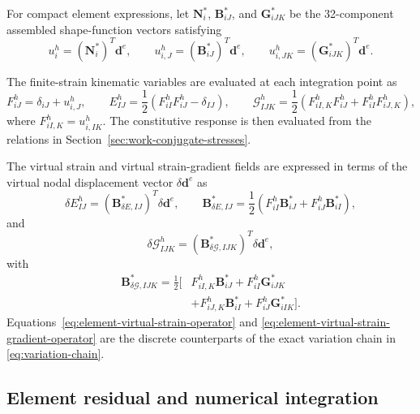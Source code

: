\documentclass[preprint,12pt]{elsarticle}
\begin{document}
For compact element expressions, let $\mathbf{N}_i^{*}$, $\mathbf{B}_{iJ}^{*}$,
and $\mathbf{G}_{iJK}^{*}$ be the 32-component assembled shape-function
vectors satisfying
\begin{equation}
 u_i^h=\left(\mathbf{N}_i^{*}\right)^T\mathbf{d}^e,
 \qquad
 u_{i,J}^h=\left(\mathbf{B}_{iJ}^{*}\right)^T\mathbf{d}^e,
 \qquad
 u_{i,JK}^h=\left(\mathbf{G}_{iJK}^{*}\right)^T\mathbf{d}^e.
 \label{eq:element-shape-function-vectors}
\end{equation}

The finite-strain kinematic variables are evaluated at each integration
point as
\begin{equation}
 F_{iJ}^h=\delta_{iJ}+u_{i,J}^h,
 \qquad
 E_{IJ}^h=\frac{1}{2}\left(F_{iI}^hF_{iJ}^h-\delta_{IJ}\right),
 \qquad
 \mathcal{G}_{IJK}^h
 =\frac{1}{2}\left(F_{iI,K}^hF_{iJ}^h
 +F_{iI}^hF_{iJ,K}^h\right),
 \label{eq:element-kinematic-variables}
\end{equation}
where $F_{iI,K}^h=u_{i,IK}^h$. The constitutive response is then
evaluated from the relations in Section~\ref{sec:work-conjugate-stresses}.

The virtual strain and virtual strain-gradient fields are expressed
in terms of the virtual nodal displacement vector $\delta\mathbf{d}^e$ as
\begin{equation}
 \delta E_{IJ}^h
 =\left(\mathbf{B}_{\delta E,IJ}^{*}\right)^T\delta\mathbf{d}^e,
 \qquad
 \mathbf{B}_{\delta E,IJ}^{*}
 =\frac{1}{2}\left(F_{iI}^h\mathbf{B}_{iJ}^{*}
 +F_{iJ}^h\mathbf{B}_{iI}^{*}\right),
 \label{eq:element-virtual-strain-operator}
\end{equation}
and
\begin{equation}
 \delta\mathcal{G}_{IJK}^h
 =\left(\mathbf{B}_{\delta\mathcal{G},IJK}^{*}\right)^T
 \delta\mathbf{d}^e,
 \label{eq:element-virtual-strain-gradient}
\end{equation}
with
\begin{align}
 \mathbf{B}_{\delta\mathcal{G},IJK}^{*}
 =\frac{1}{2}\bigl[
 &F_{iI,K}^h\mathbf{B}_{iJ}^{*}
 +F_{iI}^h\mathbf{G}_{iJK}^{*}
 \nonumber\\
 &+F_{iJ,K}^h\mathbf{B}_{iI}^{*}
 +F_{iJ}^h\mathbf{G}_{iIK}^{*}
 \bigr].
 \label{eq:element-virtual-strain-gradient-operator}
\end{align}
Equations~\eqref{eq:element-virtual-strain-operator} and
\eqref{eq:element-virtual-strain-gradient-operator} are the discrete
counterparts of the exact variation chain in
\eqref{eq:variation-chain}.

\subsection{Element residual and numerical integration}
\label{sec:element-residual-integration}
\end{document}
